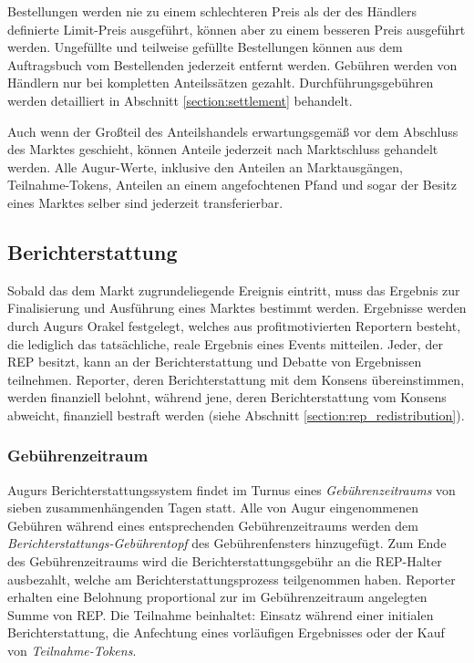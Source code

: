 \documentclass[floatfix,reprint,nofootinbib,amsmath,amssymb,epsfig,pre,floats,letterpaper,groupedaffiliation]{revtex4-1}
\theoremstyle{definition}
\theoremstyle{definition}
\theoremstyle{definition}
\begin{document}
Bestellungen werden nie zu einem schlechteren Preis als der des Händlers definierte Limit-Preis ausgeführt, können aber zu einem besseren Preis ausgeführt werden. Ungefüllte und teilweise gefüllte Bestellungen können aus dem Auftragsbuch vom Bestellenden jederzeit entfernt werden. Gebühren werden von Händlern nur bei kompletten Anteilssätzen gezahlt. Durchführungsgebühren werden detailliert in Abschnitt \ref{section:settlement} behandelt.

Auch wenn der Großteil des Anteilshandels erwartungsgemäß vor dem Abschluss des Marktes geschieht, können Anteile jederzeit nach Marktschluss gehandelt werden. Alle Augur-Werte, inklusive den Anteilen an Marktausgängen, Teilnahme-Tokens, Anteilen an einem angefochtenen Pfand und sogar der Besitz eines Marktes selber sind jederzeit transferierbar.

\subsection{Berichterstattung}\label{section:reporting}

Sobald das dem Markt zugrundeliegende Ereignis eintritt, muss das Ergebnis zur Finalisierung und Ausführung eines Marktes bestimmt werden. Ergebnisse werden durch Augurs Orakel festgelegt, welches aus profitmotivierten Reportern besteht, die lediglich das tatsächliche, reale Ergebnis eines Events mitteilen. Jeder, der REP besitzt, kann an der Berichterstattung und Debatte von Ergebnissen teilnehmen. Reporter, deren Berichterstattung mit dem Konsens übereinstimmen, werden finanziell belohnt, während jene, deren Berichterstattung vom Konsens abweicht, finanziell bestraft werden (siehe Abschnitt \ref{section:rep_redistribution}).

\subsubsection{Gebührenzeitraum}

Augurs Berichterstattungssystem findet im Turnus eines \textit{Gebührenzeitraums} von sieben zusammenhängenden Tagen statt. Alle von Augur eingenommenen Gebühren während eines entsprechenden Gebührenzeitraums werden dem \textit{Berichterstattungs-Gebührentopf} des Gebührenfensters hinzugefügt. Zum Ende des Gebührenzeitraums wird die Berichterstattungsgebühr an die REP-Halter ausbezahlt, welche am Berichterstattungsprozess teilgenommen haben. Reporter erhalten eine Belohnung proportional zur im Gebührenzeitraum angelegten Summe von REP. Die Teilnahme beinhaltet: Einsatz während einer initialen Berichterstattung, die Anfechtung eines vorläufigen Ergebnisses oder der Kauf von \textit{Teilnahme-Tokens}.
\end{document}
